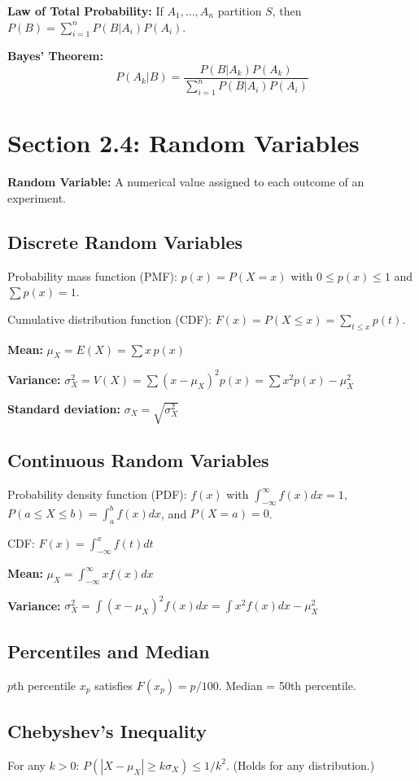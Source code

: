 \documentclass[11pt]{article}
\begin{document}
\textbf{Law of Total Probability:} If \(A_1,\dots,A_n\) partition \(S\), then \(P(B) = \sum_{i=1}^n P(B|A_i)P(A_i)\).

\textbf{Bayes' Theorem:}
\[
P(A_k|B) = \frac{P(B|A_k)P(A_k)}{\sum_{i=1}^n P(B|A_i)P(A_i)}
\]

\section*{Section 2.4: Random Variables}
\textbf{Random Variable:} A numerical value assigned to each outcome of an experiment.

\subsection*{Discrete Random Variables}
Probability mass function (PMF): \(p(x)=P(X=x)\) with \(0\le p(x)\le1\) and \(\sum p(x)=1\).

Cumulative distribution function (CDF): \(F(x)=P(X\le x)=\sum_{t\le x}p(t)\).

\textbf{Mean:} \(\mu_X = E(X) = \sum x\,p(x)\)

\textbf{Variance:} \(\sigma_X^2 = V(X) = \sum (x-\mu_X)^2 p(x) = \sum x^2 p(x) - \mu_X^2\)

\textbf{Standard deviation:} \(\sigma_X = \sqrt{\sigma_X^2}\)

\subsection*{Continuous Random Variables}
Probability density function (PDF): \(f(x)\) with \(\int_{-\infty}^{\infty} f(x)dx=1\), \(P(a\le X\le b)=\int_a^b f(x)dx\), and \(P(X=a)=0\).

CDF: \(F(x) = \int_{-\infty}^x f(t)dt\)

\textbf{Mean:} \(\mu_X = \int_{-\infty}^{\infty} x f(x)dx\)

\textbf{Variance:} \(\sigma_X^2 = \int (x-\mu_X)^2 f(x)dx = \int x^2 f(x)dx - \mu_X^2\)

\subsection*{Percentiles and Median}
\(p\)th percentile \(x_p\) satisfies \(F(x_p)=p/100\). Median = 50th percentile.

\subsection*{Chebyshev's Inequality}
For any \(k>0\): \(P(|X-\mu_X|\ge k\sigma_X) \le 1/k^2\). (Holds for any distribution.)
\end{document}
